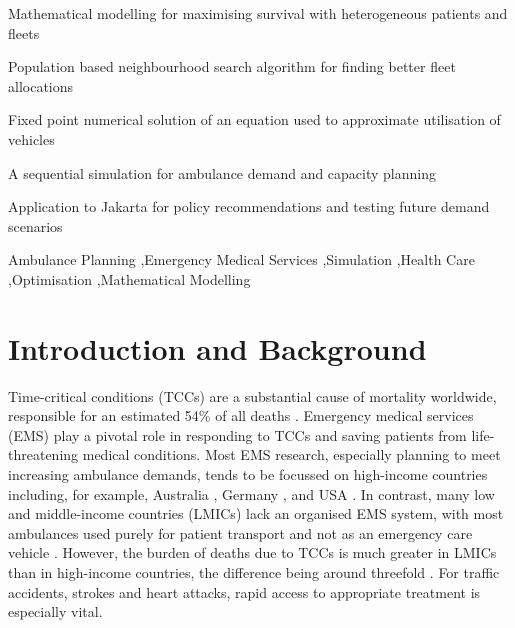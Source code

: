 \documentclass[preprint,12pt]{elsarticle}
\begin{document}
\begin{frontmatter}
\begin{abstract}
\end{abstract}


\begin{highlights}
\item Mathematical modelling for maximising survival with heterogeneous
      patients and fleets
\item Population based neighbourhood search algorithm for finding better fleet
      allocations
\item Fixed point numerical solution of an equation used to approximate utilisation
      of vehicles
\item A sequential simulation for ambulance demand and capacity planning
\item Application to Jakarta for policy recommendations and testing future
      demand scenarios
\end{highlights}

\begin{keyword}
Ambulance Planning \sep Emergency Medical Services \sep Simulation \sep Health Care \sep Optimisation \sep Mathematical Modelling
\end{keyword}

\end{frontmatter}


\newpage


\section{Introduction and Background}\label{sec:intro}
Time-critical conditions (TCCs) are a substantial cause of mortality
worldwide, responsible for an estimated 54\% of all deaths \cite{FraserBMJ}.
Emergency medical services (EMS) play a pivotal role in responding to TCCs and
saving patients from life-threatening medical conditions. Most EMS research,
especially  planning to meet increasing ambulance demands, tends to be
focussed on high-income countries including, for example, Australia
\cite{lowthian2011increasing}, Germany \cite{veser2015demographic}, and USA
\cite{birmingham2021trends}. In contrast, many low and middle-income countries
(LMICs) lack an organised EMS system, with most ambulances used purely for
patient transport and not as an emergency care vehicle \cite{plummer2017ems}.
However, the burden of deaths due to TCCs is much greater in LMICs than in
high-income countries, the difference being around threefold \cite{ChangPMC}.
For traffic accidents, strokes and heart attacks, rapid access to appropriate
treatment is especially vital. 
\end{document}
